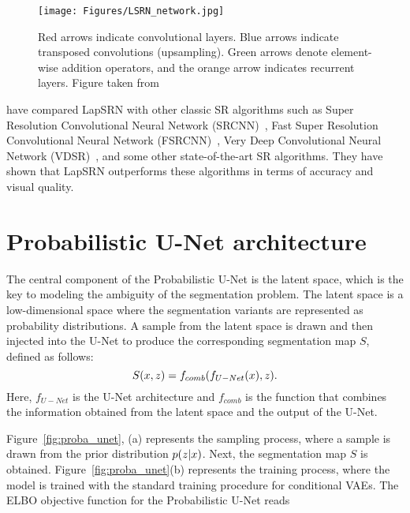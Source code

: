 
\begin{figure}[htb!]
    \centering
    \texttt{[image: Figures/LSRN\_network.jpg]}
    \caption{Red arrows indicate convolutional layers. Blue arrows indicate
    transposed convolutions (upsampling). Green arrows denote element-wise
    addition operators, and the orange arrow indicates recurrent layers. 
    Figure taken from~\citep{lai2017deep}}
    \label{fig:lsrn_network}
\end{figure}

\cite{lai2017deep} have compared LapSRN with other classic SR algorithms
such as Super Resolution Convolutional Neural Network (SRCNN)~\citep{dong2015image},
Fast Super Resolution Convolutional Neural Network (FSRCNN)~\citep{dong2016accelerating},
Very Deep Convolutional Neural Network (VDSR)~\citep{kim2016accurate}, 
and some other state-of-the-art SR algorithms.
They have shown that LapSRN outperforms these
algorithms in terms of accuracy and visual quality.


\tocless\section{Probabilistic U-Net architecture}
The central component of the Probabilistic U-Net is the latent space, which is
the key to modeling the ambiguity of the segmentation problem.
The latent space is a low-dimensional space where the segmentation variants are
represented as probability distributions.
A sample from the latent space 
is drawn and then injected into the U-Net to produce the
corresponding segmentation map $S$, defined as follows:
\begin{equation*}
    S(x, z) = f_{comb}(f_{U-Net}(x),z) \text{.}
\end{equation*}
Here, $f_{U-Net}$ is the U-Net architecture and  $f_{comb}$
is the function that combines the information obtained from the latent space and
the output of the U-Net.


Figure~\ref{fig:proba_unet},
(a) represents the sampling process, where 
a sample is  drawn  from the prior distribution $p(z|x)$. 
Next,  the segmentation map $S$ is obtained.
Figure~\ref{fig:proba_unet}(b) 
represents the training process, where the model is trained with the
standard training procedure for conditional VAEs. The ELBO objective function
for the Probabilistic U-Net reads

